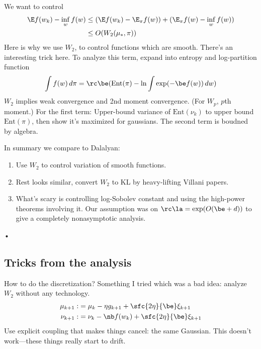 We want to control 
\begin{align}
\E f(w_k) - \inf_w f(w)
&\le 
(\E f(w_k) - \E_\pi f(w)) + (\E_\pi f(w) - \inf_w f(w))\\
&\le O(W_2(\mu_*, \pi))
\end{align}
Here is why we use $W_2$, to control functions which are smooth. %
There's an interesting trick here. To analyze this term, expand into entropy and log-partition function
$$
\int f(w)\,d\pi = \rc \be (\text{Ent}(\pi) - \ln \int\exp(-\be  f(w))\,dw)
$$
$W_2$ implies weak convergence and 2nd moment convergence. (For $W_p$, $p$th moment.)
For the first term:
Upper-bound variance of $\text{Ent}(\nu_k)$ to upper bound $\text{Ent}(\pi)$,  then show it's maximized for gaussians. The second term is boudned by algebra.

In summary we compare to Dalalyan:
\begin{enumerate}
\item
Use $W_2$ to control variation of smooth functions.
\item
Rest looks similar, convert $W_2$ to KL by heavy-lifting Villani papers.
\item
What's scary is controlling log-Sobolev constant and using the high-power theorems involving it. Our assumption was on $\rc\la = \exp(O(\be+d))$ to give a completely nonasymptotic analysis.
\end{enumerate}•

\subsection{Tricks from the analysis}

How to do the discretization? Something I tried which was a bad idea: analyze $W_2$ without any technology. 
\begin{align}
\mu_{k+1} :&= \mu_k - \eta g_{k+1} + \sfc{2\eta}{\be} \xi_{k+1}\\
\nu_{k+1} :&= \nu_k - \nb f (w_k) + \sfc{2\eta}{\be} \xi_{k+1}
\end{align}
Use explicit coupling that makes things cancel: the same Gaussian.
This doesn't work---these things really start to drift.

